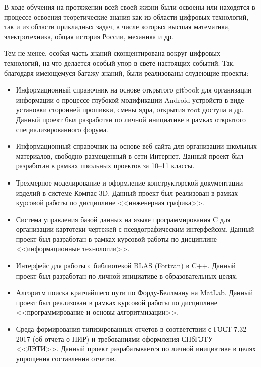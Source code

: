 В ходе обучения на протяжении всей своей жизни были освоены или находятся в процессе освоения теоретические знания как из области цифровых технологий, так и из области прикладных задач, в числе которых высшая математика, электротехника, общая история России, механика и др.

Тем не менее, особая часть знаний сконцентирована вокруг цифровых технологий, на что делается особый упор в свете настоящих событий. Так, благодаря имеющемуся багажу знаний, были реализованы слудеющие проекты:
\begin{itemize}
    \item Информационный справочник на основе открытого gitbook для организации информации о процессе глубокой модификации Android устройств в виде установки сторонней прошивки, смены ядра, открытия root доступа и др. Данный проект был разработан по личной инициативе в рамках открытого специализированного форума.
    \item Информационный справочник на основе веб-сайта для организации школьных материалов, свободно размещенный в сети Интернет. Данный проект был разработан в рамках школьных проектов за 10--11 классы.
    \item Трехмерное моделирование и оформление конструкторской документации изделий в системе Компас-3D. Данный проект был реализован в рамках курсовой работы по дисциплине <<инженерная графика>>.
    \item Система управления базой данных на языке программирования C для организации картотеки чертежей с псевдографическим интерфейсом. Данный проект был разработан в рамках курсовой работы по дисциплине <<информационные технологии>>.
    \item Интерфейс для работы с библиотекой BLAS (Fortran) в C++. Данный проект был разработан по личной инициативе в образовательных целях.
    \item Алгоритм поиска кратчайшего пути по Форду-Беллману на MatLab. Данный проект был реализован в рамках курсовой работы по дисциплине <<программирование и основы алгоритмизации>>.
    \item Среда формирования типизированных отчетов в соответствии с ГОСТ 7.32-2017 (об отчета о НИР) и требованиями оформления СПбГЭТУ <<ЛЭТИ>>. Данный проект разрабатывается по личной инициативе в целях упрощения составления отчетов.
\end{itemize}

